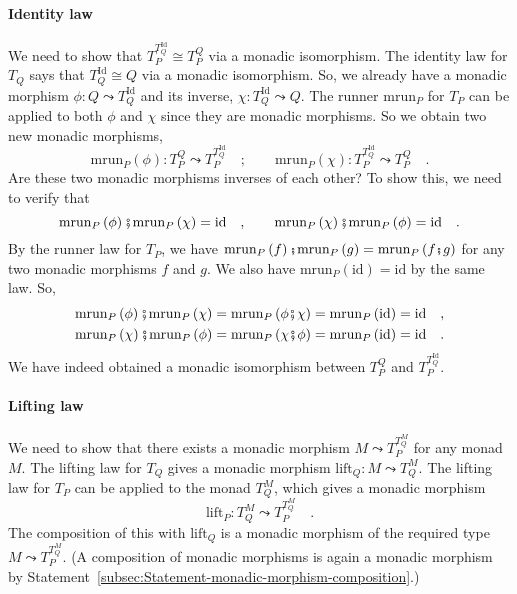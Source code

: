 \paragraph{Identity law}

We need to show that $T_{P}^{T_{Q}^{\text{Id}}}\cong T_{P}^{Q}$ via
a monadic isomorphism. The identity law for $T_{Q}$ says that $T_{Q}^{\text{Id}}\cong Q$
via a monadic isomorphism. So, we already have a monadic morphism
$\phi:Q\leadsto T_{Q}^{\text{Id}}$ and its inverse, $\chi:T_{Q}^{\text{Id}}\leadsto Q$.
The runner $\text{mrun}_{P}$ for $T_{P}$ can be applied to both
$\phi$ and $\chi$ since they are monadic morphisms. So we obtain
two new monadic morphisms,
\[
\text{mrun}_{P}\left(\phi\right):T_{P}^{Q}\leadsto T_{P}^{T_{Q}^{\text{Id}}}\quad;\quad\quad\text{mrun}_{P}\left(\chi\right):T_{P}^{T_{Q}^{\text{Id}}}\leadsto T_{P}^{Q}\quad.
\]
Are these two monadic morphisms inverses of each other? To show this,
we need to verify that
\[
\text{mrun}_{P}\left(\phi\right)\bef\text{mrun}_{P}\left(\chi\right)=\text{id}\quad,\quad\quad\text{mrun}_{P}\left(\chi\right)\bef\text{mrun}_{P}\left(\phi\right)=\text{id}\quad.
\]
By the runner law for $T_{P}$, we have $\text{mrun}_{P}\left(f\right)\bef\text{mrun}_{P}\left(g\right)=\text{mrun}_{P}\left(f\bef g\right)$
for any two monadic morphisms $f$ and $g$. We also have $\text{mrun}_{P}\left(\text{id}\right)=\text{id}$
by the same law. So, 
\begin{align*}
\text{mrun}_{P}\left(\phi\right)\bef\text{mrun}_{P}\left(\chi\right) & =\text{mrun}_{P}\left(\phi\bef\chi\right)=\text{mrun}_{P}\left(\text{id}\right)=\text{id}\quad,\\
\text{mrun}_{P}\left(\chi\right)\bef\text{mrun}_{P}\left(\phi\right) & =\text{mrun}_{P}\left(\chi\bef\phi\right)=\text{mrun}_{P}\left(\text{id}\right)=\text{id}\quad.
\end{align*}
We have indeed obtained a monadic isomorphism between $T_{P}^{Q}$
and $T_{P}^{T_{Q}^{\text{Id}}}$.

\paragraph{Lifting law}

We need to show that there exists a monadic morphism $M\leadsto T_{P}^{T_{Q}^{M}}$
for any monad $M$. The lifting law for $T_{Q}$ gives a monadic morphism
$\text{lift}_{Q}:M\leadsto T_{Q}^{M}$. The lifting law for $T_{P}$
can be applied to the monad $T_{Q}^{M}$, which gives a monadic morphism
\[
\text{lift}_{P}:T_{Q}^{M}\leadsto T_{P}^{T_{Q}^{M}}\quad.
\]
The composition of this with $\text{lift}_{Q}$ is a monadic morphism
of the required type $M\leadsto T_{P}^{T_{Q}^{M}}$. (A composition
of monadic morphisms is again a monadic morphism by Statement~\ref{subsec:Statement-monadic-morphism-composition}.)

